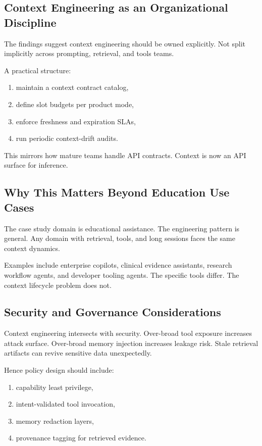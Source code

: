 \documentclass[conference]{IEEEtran}
\begin{document}
\subsection{Context Engineering as an Organizational Discipline}

The findings suggest context engineering should be owned explicitly.
Not split implicitly across prompting,
retrieval,
and tools teams.

A practical structure:

\begin{enumerate}[leftmargin=1.2em]
\item maintain a context contract catalog,
\item define slot budgets per product mode,
\item enforce freshness and expiration SLAs,
\item run periodic context-drift audits.
\end{enumerate}

This mirrors how mature teams handle API contracts.
Context is now an API surface for inference.

\subsection{Why This Matters Beyond Education Use Cases}

The case study domain is educational assistance.
The engineering pattern is general.
Any domain with retrieval,
tools,
and long sessions faces the same context dynamics.

Examples include enterprise copilots,
clinical evidence assistants,
research workflow agents,
and developer tooling agents.
The specific tools differ.
The context lifecycle problem does not.

\subsection{Security and Governance Considerations}

Context engineering intersects with security.
Over-broad tool exposure increases attack surface.
Over-broad memory injection increases leakage risk.
Stale retrieval artifacts can revive sensitive data unexpectedly.

Hence policy design should include:

\begin{enumerate}[leftmargin=1.2em]
\item capability least privilege,
\item intent-validated tool invocation,
\item memory redaction layers,
\item provenance tagging for retrieved evidence.
\end{enumerate}
\end{document}

